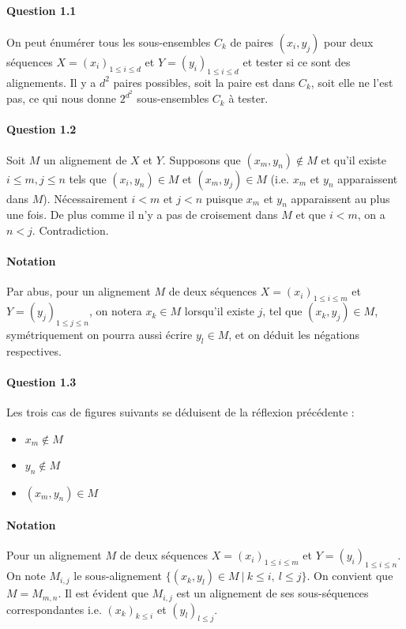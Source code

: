 \paragraph{Question 1.1}
On peut \'enum\'erer tous les sous-ensembles $C_k$ de paires
$(x_i,y_j)$ pour deux s\'equences $X=(x_i)_{1\leq i\leq d}$ et
$Y=(y_i)_{1\leq i\leq d}$ et tester si ce sont des alignements. Il y a
$d^2$ paires possibles, soit la paire est dans $C_k$, soit elle ne
l'est pas, ce qui nous donne $2^{d^2}$ sous-ensembles $C_k$ \`a tester.
\paragraph{Question 1.2}
Soit $M$ un alignement de $X$ et $Y$. Supposons que $(x_m,y_n)\not\in M$
et qu'il existe $i\leq m, j\leq n$ tels que $(x_i,y_n)\in M$ et
$(x_m,y_j)\in M$ (i.e. $x_m$ et $y_n$ apparaissent dans
$M$). N\'ecessairement $i<m$ et $j<n$ puisque $x_m$ et $y_n$
apparaissent au plus une fois. De plus comme il n'y a pas de
croisement dans $M$ et que $i<m$, on a $n<j$. Contradiction.
\paragraph{Notation}
Par abus, pour un alignement $M$ de deux s\'equences 
$X=(x_i)_{1\leq i\leq m}$ et $Y=(y_j)_{1\leq j\leq n}$,
on notera $x_k\in M$ lorsqu'il existe $j$, tel que $(x_k,y_j)\in M$,
sym\'etriquement on pourra aussi \'ecrire $y_l\in M$, et on d\'eduit les
n\'egations respectives.
\paragraph{Question 1.3}
Les trois cas de figures suivants se d\'eduisent de la r\'eflexion
pr\'ec\'edente :
\begin{itemize}
\item $x_m\not\in M$
\item $y_n\not\in M$
\item $(x_m,y_n)\in M$
\end{itemize}
\paragraph{Notation}
Pour un alignement $M$ de deux s\'equences $X=(x_i)_{1\leq i\leq m}$
et $Y=(y_i)_{1\leq i\leq n}$. On note $M_{i,j}$ le sous-alignement
$\Big\{(x_k,y_l)\in M\ |\ k\leq i,\ l\leq j\Big\}$. On convient que
$M=M_{m,n}$. Il est \'evident que $M_{i,j}$ est un alignement de ses
sous-s\'equences correspondantes i.e. $(x_k)_{k\leq i}$ et
$(y_l)_{l\leq j}$.
\pagebreak
